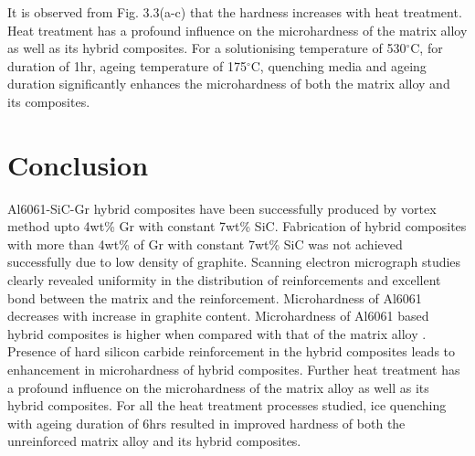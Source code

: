 \documentclass[10pt,a4paper]{article}
\numberwithin{figure}{section}
\numberwithin{table}{section}
\begin{document}
It is observed from Fig. 3.3(a-c) that the hardness increases with heat treatment.
Heat treatment has a profound influence on the microhardness of the matrix alloy as well as its hybrid composites. For a solutionising temperature of 530$^\circ$C, for duration of 1hr, ageing temperature of 175$^\circ$C, quenching media and ageing duration significantly enhances the microhardness of both the matrix alloy and its composites.


\section{Conclusion}
Al6061-SiC-Gr hybrid composites have been successfully produced by vortex method upto 4wt\% Gr with constant 7wt\% SiC. Fabrication of hybrid composites with more than 4wt\% of Gr with constant 7wt\% SiC was not achieved successfully due to low density of graphite. Scanning electron micrograph studies clearly revealed uniformity in the distribution of reinforcements and excellent bond between the matrix and the reinforcement. Microhardness of Al6061 decreases with increase in graphite content. Microhardness of Al6061 based hybrid composites is higher when compared with that of the matrix alloy . Presence of hard silicon carbide reinforcement in the hybrid composites leads to enhancement in microhardness of hybrid composites. Further heat treatment has a profound influence on the microhardness of the matrix alloy as well as its hybrid composites. For all the heat treatment processes studied, ice quenching with ageing duration of 6hrs resulted in improved hardness of both the unreinforced matrix alloy and its hybrid composites.
\clearpage
\renewcommand{\bibname}{Reference}


\end{document}
